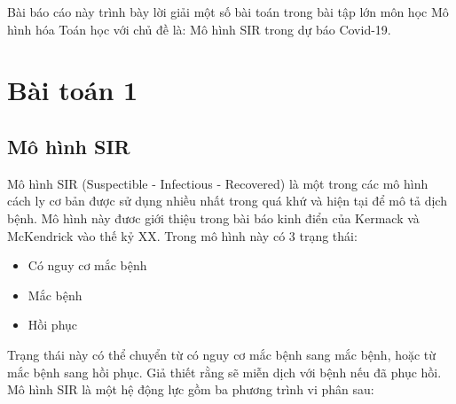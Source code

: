 \documentclass[a4paper]{article}
\begin{document}

\newpage
\tableofcontents
\newpage

Bài báo cáo này trình bày lời giải một số bài toán trong bài tập lớn môn học Mô hình hóa Toán học với chủ đề là: Mô hình SIR trong dự báo Covid-19.
\section{Bài toán 1}
\subsection{Mô hình SIR}
Mô hình SIR (Suspectible - Infectious - Recovered) là một trong các mô hình cách ly cơ bản được sử dụng nhiều nhất trong quá khứ và hiện tại để mô tả dịch bệnh. Mô hình này đươc giới thiệu trong bài báo kinh điển của Kermack và McKendrick vào thế kỷ XX. Trong mô hình này có 3 trạng thái: 
\begin{itemize}
    \item Có nguy cơ mắc bệnh
    \item Mắc bệnh
    \item Hồi phục
\end{itemize}
Trạng thái này có thể chuyển từ có nguy cơ mắc bệnh sang mắc bệnh, hoặc từ mắc bệnh sang hồi phục. Giả thiết rằng sẽ miễn dịch với bệnh nếu đã phục hồi.\\
Mô hình SIR là một hệ động lực gồm ba phương trình vi phân sau:
\\
\end{document}
